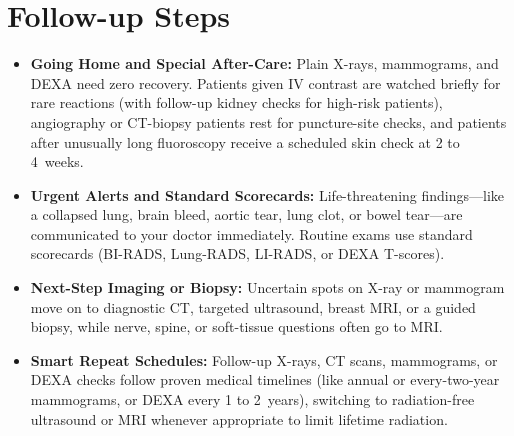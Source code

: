 \section{Follow-up Steps}
\begin{itemize}
  \item \textbf{Going Home and Special After-Care:} Plain X-rays, mammograms, and DEXA need zero recovery. Patients given IV contrast are watched briefly for rare reactions (with follow-up kidney checks for high-risk patients), angiography or CT-biopsy patients rest for puncture-site checks, and patients after unusually long fluoroscopy receive a scheduled skin check at 2 to 4~weeks.
  \item \textbf{Urgent Alerts and Standard Scorecards:} Life-threatening findings---like a collapsed lung, brain bleed, aortic tear, lung clot, or bowel tear---are communicated to your doctor immediately. Routine exams use standard scorecards (BI-RADS, Lung-RADS, LI-RADS, or DEXA T-scores).
  \item \textbf{Next-Step Imaging or Biopsy:} Uncertain spots on X-ray or mammogram move on to diagnostic CT, targeted ultrasound, breast MRI, or a guided biopsy, while nerve, spine, or soft-tissue questions often go to MRI.
  \item \textbf{Smart Repeat Schedules:} Follow-up X-rays, CT scans, mammograms, or DEXA checks follow proven medical timelines (like annual or every-two-year mammograms, or DEXA every 1 to 2~years), switching to radiation-free ultrasound or MRI whenever appropriate to limit lifetime radiation.
\end{itemize}

